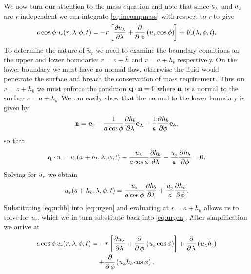 We now turn our attention to the mass equation and note that since ${u_{\scriptscriptstyle \lambda}}$ and ${u_{\scriptscriptstyle \phi}}$ are $r$-independent we can integrate \eqref{eq:incompmass} with respect to $r$ to give
\begin{equation}
a\cos\phi \, {u_{\scriptscriptstyle r}}(r,\lambda,\phi,t) = -r\left[{\frac{\partial {\ensuremath{u_{\scriptscriptstyle \lambda}}}}{\partial \lambda}} + \frac{\partial}{\partial \, \phi} \left({u_{\scriptscriptstyle \phi}}\cos\phi \right) \right] + \tilde{u}_{\scriptscriptstyle r}(\lambda,\phi,t). \label{eq:urgen}
\end{equation}
To determine the nature of $\tilde{u}_{\scriptscriptstyle r}$ we need to examine the boundary conditions on the upper and lower boundaries $r=a+\bar{h}$ and $r=a+h_b$ respectively. On the lower boundary we must have no normal flow, otherwise the fluid would penetrate the surface and breach the conservation of mass requirement. Thus on $r=a+h_b$ we must enforce the condition $\mathbf{q}\cdot\mathbf{n}=0$ where $\mathbf{n}$ is a normal to the surface $r=a+h_b$. We can easily show that the normal to the lower boundary is given by
\begin{equation}
\mathbf{n}=\mbox{\bfseries e}_{r}-\frac{1}{a\cos\phi}{\frac{\partial h_b}{\partial \lambda}}\mbox{\bfseries e}_{\lambda}-\frac{1}{a}{\frac{\partial h_b}{\partial \phi}}\mbox{\bfseries e}_{\phi},
\end{equation}
so that
\begin{equation}
\mathbf{q}\cdot\mathbf{n}={u_{\scriptscriptstyle r}}(a+h_b,\lambda,\phi,t)-\frac{{u_{\scriptscriptstyle \lambda}}}{a\cos\phi}{\frac{\partial h_b}{\partial \lambda}}-\frac{{u_{\scriptscriptstyle \phi}}}{a}{\frac{\partial h_b}{\partial \phi}}=0.
\end{equation}
Solving for ${u_{\scriptscriptstyle r}}$ we obtain
\begin{equation}
{\ensuremath{u_{\scriptscriptstyle r}}}(a+h_b,\lambda,\phi,t)=\frac{{u_{\scriptscriptstyle \lambda}}}{a\cos\phi}{\frac{\partial h_b}{\partial \lambda}}+\frac{{u_{\scriptscriptstyle \phi}}}{a}{\frac{\partial h_b}{\partial \phi}}. \label{eq:urhb}
\end{equation}
Substituting \eqref{eq:urhb} into \eqref{eq:urgen} and evaluating at $r=a+h_b$ allows us to solve for $\tilde{u}_{\scriptscriptstyle r}$, which we in turn substitute back into \eqref{eq:urgen}. After simplification we arrive at
\begin{multline}
a\cos\phi \, {u_{\scriptscriptstyle r}}(r,\lambda,\phi,t) = -r\left[{\frac{\partial {\ensuremath{u_{\scriptscriptstyle \lambda}}}}{\partial \lambda}} + \frac{\partial}{\partial \, \phi} \left({u_{\scriptscriptstyle \phi}}\cos\phi \right) \right] +\frac{\partial}{\partial \, \lambda}\left({u_{\scriptscriptstyle \lambda}} h_b\right) \\+ \frac{\partial}{\partial \, \phi} \left({u_{\scriptscriptstyle \phi}} h_b \cos\phi \right). \label{eq:urgen1}
\end{multline}

